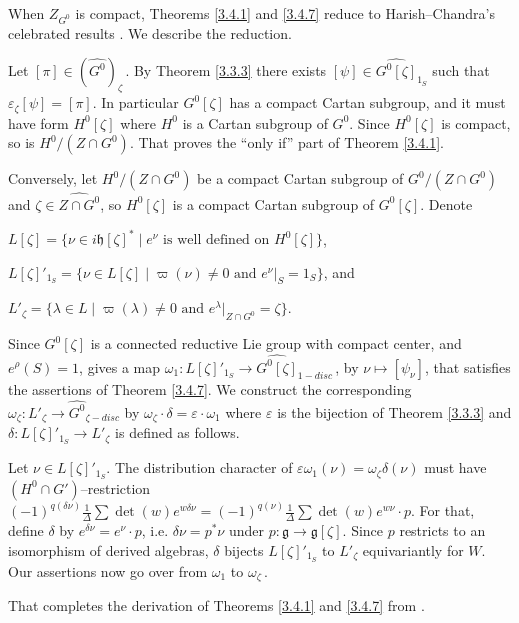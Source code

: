 \documentclass{conm-p-l}
\renewcommand{\gg}{\mathfrak{g}}
\def\gg{\mathfrak{g}}
\def\gh{\mathfrak{h}}
\begin{document}
When $Z_{G^0}$ is compact, Theorems \ref{3.4.1} and \ref{3.4.7} reduce to
Harish--Chandra's celebrated results \cite[Theorems 13 and 16]{HC1966}.
We describe the reduction.

Let $[\pi] \in (\widehat{G^0})_\zeta$\,.  By Theorem \ref{3.3.3} there exists
$[\psi] \in \widehat{G^0[\zeta]}_{1_S}$ such that $\varepsilon_\zeta[\psi]
= [\pi]$.  In particular \cite[Theorem 13]{HC1966} $G^0[\zeta]$ has a compact
Cartan subgroup, and it must have form $H^0[\zeta]$ where $H^0$ is a Cartan
subgroup of $G^0$.  Since $H^0[\zeta]$ is compact, so is $H^0/(Z\cap G^0)$.
That proves the ``only if'' part of Theorem \ref{3.4.1}.

Conversely,
let $H^0/(Z\cap G^0)$ be a compact Cartan subgroup of $G^0/(Z\cap G^0)$
and $\zeta \in \widehat{Z\cap G^0}$, so $H^0[\zeta]$ is a compact Cartan
subgroup of $G^0[\zeta]$.  Denote 

$L[\zeta] = \{\nu \in i\gh[\zeta]^* \mid
e^\nu \text{ is well defined on } H^0[\zeta]\}$,

$L[\zeta]'_{1_S} = \{\nu \in L[\zeta] \mid \varpi(\nu) \ne 0
\text{ and } e^\nu|_S = 1_S\}$, and

$L'_\zeta = \{\lambda \in L \mid \varpi(\lambda) \ne 0 \text{ and }
e^\lambda|_{Z\cap G^0} = \zeta\}$.

\noindent
Since $G^0[\zeta]$ is a connected reductive Lie group with compact center, and
$e^\rho(S) = 1$, \cite[Theorem 16]{HC1966} gives a map 
$\omega_1: L[\zeta]'_{1_S} \to \widehat{G^0[\zeta]}_{1-disc}$\,, by
$\nu \mapsto [\psi_\nu]$, that satisfies the assertions of Theorem \ref{3.4.7}.
We construct the corresponding 
$\omega_\zeta: L'_\zeta \to \widehat{G^0}_{\zeta-disc}$ by
$\omega_\zeta\cdot\delta = \varepsilon\cdot\omega_1$ where $\varepsilon$ is
the bijection of Theorem \ref{3.3.3} and $\delta :
L[\zeta]'_{1_S} \to L'_\zeta$ is defined as follows.

Let $\nu \in L[\zeta]'_{1_S}$.  The distribution character of
$\varepsilon\omega_1(\nu) = \omega_\zeta \delta(\nu)$ must have
$(H^0\cap G')$--restriction $(-1)^{q(\delta \nu)}\tfrac{1}{\Delta}
\sum \det(w)e^{w\delta \nu} = (-1)^{q(\nu)}\tfrac{1}{\Delta}
\sum \det(w) e^{w\nu}\cdot p$.  For that, define $\delta$ by
$e^{\delta\nu} = e^\nu\cdot p$, i.e. $\delta\nu = p^*\nu$ under
$p:\gg \to \gg[\zeta]$.  Since $p$ restricts to an isomorphism of derived
algebras, $\delta$ bijects $L[\zeta]'_{1_S}$ to $L'_\zeta$ equivariantly
for $W$.  Our assertions now go over from $\omega_1$ to $\omega_\zeta$\,.

That completes the derivation of Theorems \ref{3.4.1} and \ref{3.4.7}
from \cite{HC1966}.
\end{document}
